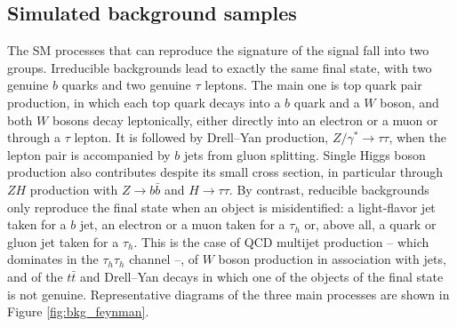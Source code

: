 \subsection{Simulated background samples}
%
The SM processes that can reproduce the signature of the signal fall into two groups. Irreducible backgrounds lead to exactly the same final state, with two genuine $b$ quarks and two genuine $\tau$ leptons. The main one is top quark pair production, in which each top quark decays into a $b$ quark and a $W$ boson, and both $W$ bosons decay leptonically, either directly into an electron or a muon or through a $\tau$ lepton. It is followed by Drell--Yan production, $Z/\gamma^*\to\tau\tau$, when the lepton pair is accompanied by $b$ jets from gluon splitting. Single Higgs boson production also contributes despite its small cross section, in particular through $ZH$ production with $Z\to b\bar{b}$ and $H\to\tau\tau$. By contrast, reducible backgrounds only reproduce the final state when an object is misidentified: a light-flavor jet taken for a $b$ jet, an electron or a muon taken for a $\tau_h$ or, above all, a quark or gluon jet taken for a $\tau_h$. This is the case of QCD multijet production -- which dominates in the $\tau_h\tau_h$ channel --, of $W$ boson production in association with jets, and of the $t\bar{t}$ and Drell--Yan decays in which one of the objects of the final state is not genuine. Representative diagrams of the three main processes are shown in Figure \ref{fig:bkg_feynman}.
%
